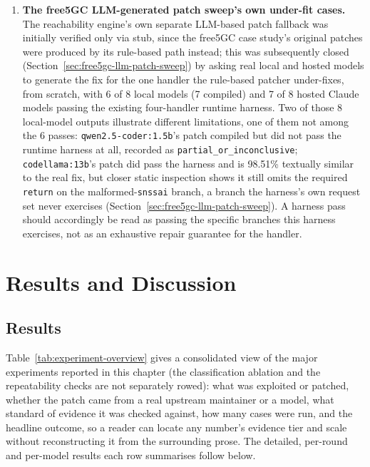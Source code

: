 \documentclass[12pt,a4paper]{report}
\begin{document}
\begin{enumerate}
\item \textbf{The free5GC LLM-generated patch sweep's own under-fit cases.} The reachability engine's own separate LLM-based patch fallback was initially verified only via stub, since the free5GC case study's original patches were produced by its rule-based path instead; this was subsequently closed (Section~\ref{sec:free5gc-llm-patch-sweep}) by asking real local and hosted models to generate the fix for the one handler the rule-based patcher under-fixes, from scratch, with 6 of 8 local models (7 compiled) and 7 of 8 hosted Claude models passing the existing four-handler runtime harness. Two of those 8 local-model outputs illustrate different limitations, one of them not among the 6 passes: \texttt{qwen2.5-coder:1.5b}'s patch compiled but did not pass the runtime harness at all, recorded as \texttt{partial\_or\_inconclusive}; \texttt{codellama:13b}'s patch did pass the harness and is 98.51\% textually similar to the real fix, but closer static inspection shows it still omits the required \texttt{return} on the malformed-\texttt{snssai} branch, a branch the harness's own request set never exercises (Section~\ref{sec:free5gc-llm-patch-sweep}). A harness pass should accordingly be read as passing the specific branches this harness exercises, not as an exhaustive repair guarantee for the handler.
\end{enumerate}

\chapter{Results and Discussion}

\section{Results}

Table~\ref{tab:experiment-overview} gives a consolidated view of the major experiments reported in this chapter (the classification ablation and the repeatability checks are not separately rowed): what was exploited or patched, whether the patch came from a real upstream maintainer or a model, what standard of evidence it was checked against, how many cases were run, and the headline outcome, so a reader can locate any number's evidence tier and scale without reconstructing it from the surrounding prose. The detailed, per-round and per-model results each row summarises follow below.
\end{document}

